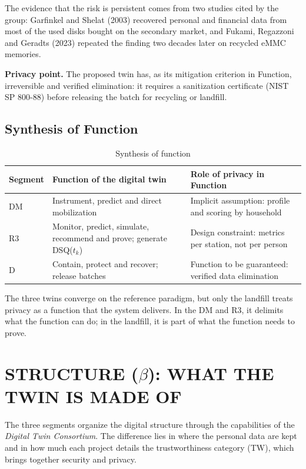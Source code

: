 \documentclass[12pt,a4paper,article,oneside,brazil,english]{abntex2}
\newcommand{\fontetab}[1]{\par\vspace{3pt}{\small\noindent Source: #1\par}}
\newcommand{\dsq}[1]{DSQ($t_{#1}$)}
\begin{document}
The evidence that the risk is persistent comes from two studies cited by the group: Garfinkel and Shelat (2003) recovered personal and financial data from most of the used disks bought on the secondary market, and Fukami, Regazzoni and Geradts (2023) repeated the finding two decades later on recycled eMMC memories.

\textbf{Privacy point.} The proposed twin has, as its mitigation criterion in Function, irreversible and verified elimination: it requires a sanitization certificate (NIST SP 800-88) before releasing the batch for recycling or landfill.

\subsection{Synthesis of Function}

\begin{table}[!htbp]
\centering
\caption{Synthesis of function}
\label{tab:sintese-funcao}
\small
\begin{tabularx}{\linewidth}{l Y Y}
\hline
\textbf{Segment} & \textbf{Function of the digital twin} & \textbf{Role of privacy in Function}\\
\hline
DM & Instrument, predict and direct mobilization & Implicit assumption: profile and scoring by household\\
R3 & Monitor, predict, simulate, recommend and prove; generate \dsq{k} & Design constraint: metrics per station, not per person\\
D & Contain, protect and recover; release batches & Function to be guaranteed: verified data elimination\\
\hline
\end{tabularx}
\fontetab{Prepared by the author (2026).}
\end{table}

The three twins converge on the reference paradigm, but only the landfill treats privacy as a function that the system delivers. In the DM and R3, it delimits what the function can do; in the landfill, it is part of what the function needs to prove.

\section{STRUCTURE (\texorpdfstring{$\beta$}{beta}): WHAT THE TWIN IS MADE OF}

The three segments organize the digital structure through the capabilities of the \textit{Digital Twin Consortium}. The difference lies in where the personal data are kept and in how much each project details the trustworthiness category (TW), which brings together security and privacy.
\end{document}
